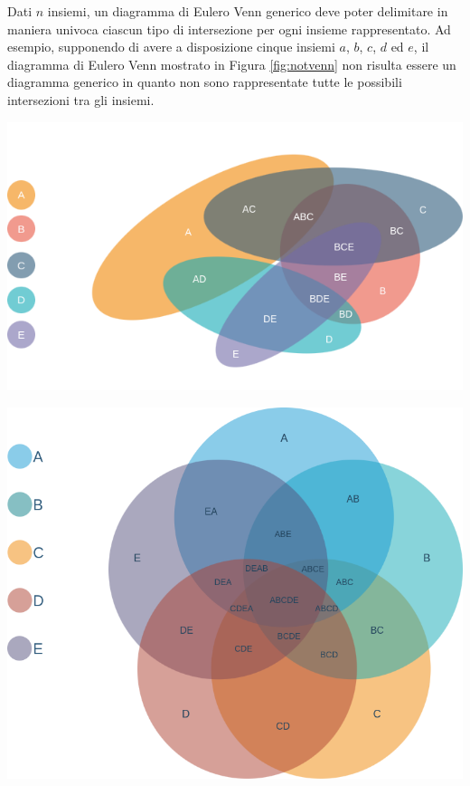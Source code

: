 Dati $n$ insiemi, un diagramma di Eulero Venn generico deve poter delimitare in maniera univoca ciascun tipo di intersezione per ogni insieme rappresentato. Ad esempio, supponendo di avere a disposizione cinque insiemi $a$, $b$, $c$, $d$ ed $e$, il diagramma di Eulero Venn mostrato in Figura \ref{fig:notvenn} non risulta essere un diagramma generico in quanto non sono rappresentate tutte le possibili intersezioni tra gli insiemi.
\begin{center}
	\begin{minipage}{.45\textwidth}
		\centering
		\includegraphics[scale=.35]{res/Not_Venn}
		\label{fig:notvenn}
	\end{minipage}
	\hfill
	\begin{minipage}{.45\textwidth}
		\centering
		\includegraphics[scale=.25]{res/Venn}
		\label{fig:venn}
	\end{minipage}
\end{center}

